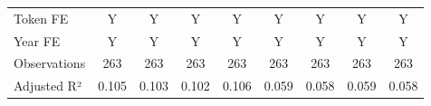 {\begin{tabular}{l*{8}{c}}
\midrule
Token FE            &           Y         &           Y         &           Y         &           Y         &           Y         &           Y         &           Y         &           Y         \\
Year FE             &           Y         &           Y         &           Y         &           Y         &           Y         &           Y         &           Y         &           Y         \\
Observations        &         263         &         263         &         263         &         263         &         263         &         263         &         263         &         263         \\
Adjusted R²         &       0.105         &       0.103         &       0.102         &       0.106         &       0.059         &       0.058         &       0.059         &       0.058         \\
\bottomrule
\end{tabular}
}
